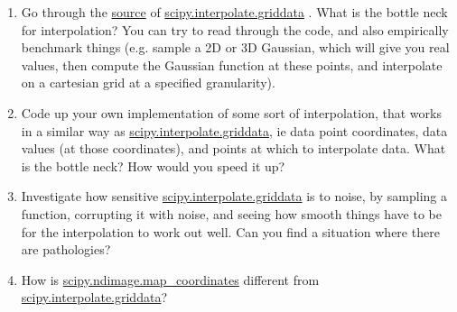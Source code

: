 \documentclass[11pt, oneside]{article}   	%
\begin{document}
\begin{enumerate} 
	\item Go through the \href{https://github.com/scipy/scipy/blob/v1.5.4/scipy/interpolate/interpnd.pyx}{source} of \href{https://docs.scipy.org/doc/scipy/reference/generated/scipy.interpolate.griddata.html}{scipy.interpolate.griddata} . What is the bottle neck for interpolation? You can try to read through the code, and also empirically benchmark things (e.g. sample a 2D or 3D Gaussian, which will give you real values, then compute the Gaussian function at these points, and interpolate on a cartesian grid at a specified granularity).
	\item Code up your own implementation of some sort of interpolation, that works in a similar way as \href{https://docs.scipy.org/doc/scipy/reference/generated/scipy.interpolate.griddata.html}{scipy.interpolate.griddata}, ie data point coordinates, data values (at those coordinates), and points at which to interpolate data. What is the bottle neck? How would you speed it up? 
	\item Investigate how sensitive \href{https://docs.scipy.org/doc/scipy/reference/generated/scipy.interpolate.griddata.html}{scipy.interpolate.griddata} is to noise, by sampling a function, corrupting it with noise, and seeing how smooth things have to be for the interpolation to work out well. Can you find a situation where there are pathologies? 
	\item How is \href{https://docs.scipy.org/doc/scipy/reference/generated/scipy.ndimage.map_coordinates.html#scipy.ndimage.map_coordinates}{scipy.ndimage.map\_coordinates} different from \href{https://docs.scipy.org/doc/scipy/reference/generated/scipy.interpolate.griddata.html}{scipy.interpolate.griddata}?
\end{enumerate}
\end{document}
